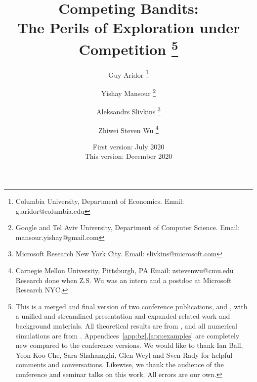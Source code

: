 \documentclass[12pt]{article}
\begin{document}

\title{\vspace{-12mm}Competing Bandits:\\
The Perils of Exploration under Competition%
\thanks{This is a merged and final version of two conference publications,
\citet*{CompetingBandits-itcs18} and \citet*{CompetingBandits-ec19},
with a unified and streamlined presentation and expanded related work and background materials. All theoretical results are from \citet{CompetingBandits-itcs18}, and all numerical simulations are from \citet{CompetingBandits-ec19}. Appendices~\ref{app:bg},\ref{app:examples} are completely new compared to the conference versions.\newline \indent
We would like to thank Ian Ball, Yeon-Koo Che, Sara Shahanaghi, Glen Weyl and Sven Rady for helpful comments and conversations. Likewise, we thank the audience of the conference and seminar talks on this work.
All errors are our own.}}


\author{Guy Aridor
\footnote{Columbia University, Department of Economics. Email: g.aridor@columbia.edu}
\and \hspace{-0.75cm}
\rule{0.0in}{0pt}
Yishay Mansour
\footnote{Google and Tel Aviv University, Department of Computer Science. Email: mansour.yishay@gmail.com}
\and \hspace{-0.75cm}
\rule{0.0in}{0pt}
Aleksandrs Slivkins%
\footnote{Microsoft Research New York City. Email: slivkins@microsoft.com}
\and \hspace{-0.75cm}
\rule{0.0in}{0pt}
Zhiwei Steven Wu%
\footnote{Carnegie Mellon University, Pittsburgh, PA
Email: zstevenwu@cmu.edu\newline
Research done when Z.S. Wu was an intern and a postdoc at Microsoft Research NYC.}
}
\date{First version: July 2020\\ This version: December 2020}

\maketitle
\end{document}
